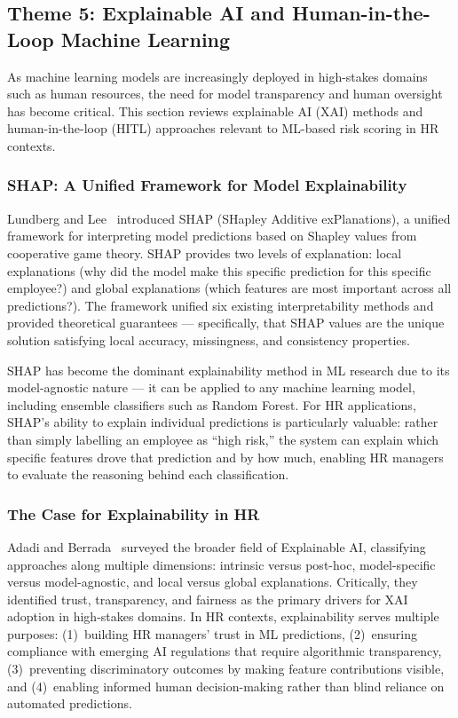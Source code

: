 \documentclass[12pt,a4paper]{article}
\begin{document}
\subsection{Theme 5: Explainable AI and Human-in-the-Loop Machine Learning}
\label{sec:theme5}

As machine learning models are increasingly deployed in high-stakes domains such as human resources, the need for model transparency and human oversight has become critical. This section reviews explainable AI (XAI) methods and human-in-the-loop (HITL) approaches relevant to ML-based risk scoring in HR contexts.

\subsubsection{SHAP: A Unified Framework for Model Explainability}

Lundberg and Lee~\cite{lundberg2017shap} introduced SHAP (SHapley Additive exPlanations), a unified framework for interpreting model predictions based on Shapley values from cooperative game theory. SHAP provides two levels of explanation: local explanations (why did the model make this specific prediction for this specific employee?) and global explanations (which features are most important across all predictions?). The framework unified six existing interpretability methods and provided theoretical guarantees --- specifically, that SHAP values are the unique solution satisfying local accuracy, missingness, and consistency properties.

SHAP has become the dominant explainability method in ML research due to its model-agnostic nature --- it can be applied to any machine learning model, including ensemble classifiers such as Random Forest. For HR applications, SHAP's ability to explain individual predictions is particularly valuable: rather than simply labelling an employee as ``high risk,'' the system can explain which specific features drove that prediction and by how much, enabling HR managers to evaluate the reasoning behind each classification.

\subsubsection{The Case for Explainability in HR}

Adadi and Berrada~\cite{adadi2018xai} surveyed the broader field of Explainable AI, classifying approaches along multiple dimensions: intrinsic versus post-hoc, model-specific versus model-agnostic, and local versus global explanations. Critically, they identified trust, transparency, and fairness as the primary drivers for XAI adoption in high-stakes domains. In HR contexts, explainability serves multiple purposes: (1)~building HR managers' trust in ML predictions, (2)~ensuring compliance with emerging AI regulations that require algorithmic transparency, (3)~preventing discriminatory outcomes by making feature contributions visible, and (4)~enabling informed human decision-making rather than blind reliance on automated predictions.
\end{document}
